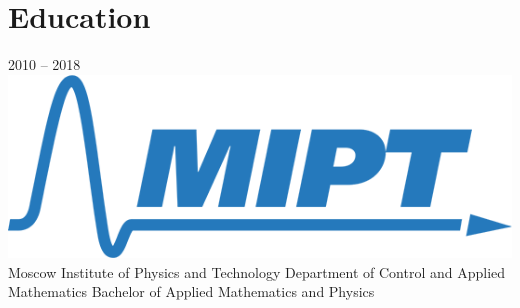 \documentclass[11pt,a4paper]{moderncv}
\begin{document}
\section{Education}
  \cventry
    {2010 – 2018}
    {\includegraphics[scale=0.5]{mipt-en-blue} Moscow Institute of Physics and Technology}
    {}
    {}{}
    {
      Department of Control and Applied Mathematics \newline{}
      Bachelor of Applied Mathematics and Physics \newline{}
    }
    {}
\end{document}
